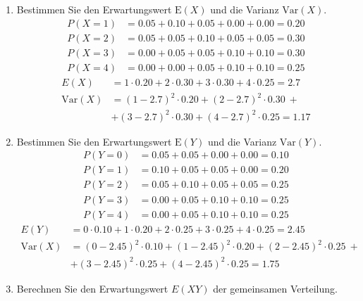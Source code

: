 \begin{enumerate}[1.]
    \item Bestimmen Sie den Erwartungswert $\text{E}(X)$ und die Varianz $\text{Var}(X)$.
        \begin{align*}
            P(X = 1)      &= 0.05 + 0.10 + 0.05 + 0.00 + 0.00 = 0.20 \\[5pt]
            P(X = 2)      &= 0.05 + 0.05 + 0.10 + 0.05 + 0.05 = 0.30 \\[5pt]
            P(X = 3)      &= 0.00 + 0.05 + 0.05 + 0.10 + 0.10 = 0.30 \\[5pt]
            P(X = 4)      &= 0.00 + 0.00 + 0.05 + 0.10 + 0.10 = 0.25
        \end{align*}
        \begin{align*}
            E(X)          &= 1 \cdot 0.20 + 2 \cdot 0.30 + 3 \cdot 0.30 + 4 \cdot 0.25 = 2.7 \\[5pt]
            \text{Var}(X) &= (1 - 2.7)^2 \cdot 0.20 + (2 - 2.7)^2 \cdot 0.30\ +\\[5pt]
                          &+ (3 - 2.7)^2 \cdot 0.30 + (4 - 2.7)^2 \cdot 0.25 = 1.17
        \end{align*}
    \item Bestimmen Sie den Erwartungswert $\text{E}(Y)$ und die Varianz $\text{Var}(Y)$.
        \begin{align*}
            P(Y = 0)      &= 0.05 + 0.05 + 0.00 + 0.00 = 0.10 \\[5pt]
            P(Y = 1)      &= 0.10 + 0.05 + 0.05 + 0.00 = 0.20 \\[5pt]
            P(Y = 2)      &= 0.05 + 0.10 + 0.05 + 0.05 = 0.25 \\[5pt]
            P(Y = 3)      &= 0.00 + 0.05 + 0.10 + 0.10 = 0.25 \\[5pt]
            P(Y = 4)      &= 0.00 + 0.05 + 0.10 + 0.10 = 0.25
        \end{align*}
        \begin{align*}
            E(Y)          &= 0 \cdot 0.10 + 1 \cdot 0.20 + 2 \cdot 0.25 + 3 \cdot 0.25 + 4 \cdot 0.25 = 2.45 \\[5pt]
            \text{Var}(X) &= (0 - 2.45)^2 \cdot 0.10 + (1 - 2.45)^2 \cdot 0.20 + (2 - 2.45)^2 \cdot 0.25\ +  \\[5pt]
                          &+ (3 - 2.45)^2 \cdot 0.25 + (4 - 2.45)^2 \cdot 0.25 = 1.75
        \end{align*}
    \item Berechnen Sie den Erwartungswert $E(XY)$ der gemeinsamen Verteilung.

\end{enumerate}
